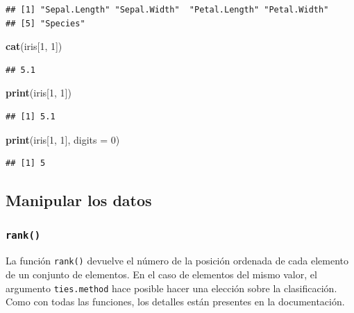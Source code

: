 \documentclass[]{book}
\newenvironment{Shaded}{\begin{snugshade}}{\end{snugshade}}
\newcommand{\KeywordTok}[1]{\textcolor[rgb]{0.13,0.29,0.53}{\textbf{#1}}}
\newcommand{\DataTypeTok}[1]{\textcolor[rgb]{0.13,0.29,0.53}{#1}}
\newcommand{\DecValTok}[1]{\textcolor[rgb]{0.00,0.00,0.81}{#1}}
\newcommand{\NormalTok}[1]{#1}
\begin{document}
\begin{verbatim}
## [1] "Sepal.Length" "Sepal.Width"  "Petal.Length" "Petal.Width" 
## [5] "Species"
\end{verbatim}

\begin{Shaded}
\begin{Highlighting}[]
\KeywordTok{cat}\NormalTok{(iris[}\DecValTok{1}\NormalTok{, }\DecValTok{1}\NormalTok{])}
\end{Highlighting}
\end{Shaded}

\begin{verbatim}
## 5.1
\end{verbatim}

\begin{Shaded}
\begin{Highlighting}[]
\KeywordTok{print}\NormalTok{(iris[}\DecValTok{1}\NormalTok{, }\DecValTok{1}\NormalTok{])}
\end{Highlighting}
\end{Shaded}

\begin{verbatim}
## [1] 5.1
\end{verbatim}

\begin{Shaded}
\begin{Highlighting}[]
\KeywordTok{print}\NormalTok{(iris[}\DecValTok{1}\NormalTok{, }\DecValTok{1}\NormalTok{], }\DataTypeTok{digits =} \DecValTok{0}\NormalTok{)}
\end{Highlighting}
\end{Shaded}

\begin{verbatim}
## [1] 5
\end{verbatim}

\subsection{Manipular los datos}\label{manipular-los-datos}

\subsubsection{\texorpdfstring{\texttt{rank()}}{rank()}}\label{l015rank}

La función \texttt{rank()} devuelve el número de la posición ordenada de
cada elemento de un conjunto de elementos. En el caso de elementos del
mismo valor, el argumento \texttt{ties.method} hace posible hacer una
elección sobre la clasificación. Como con todas las funciones, los
detalles están presentes en la documentación.
\end{document}
